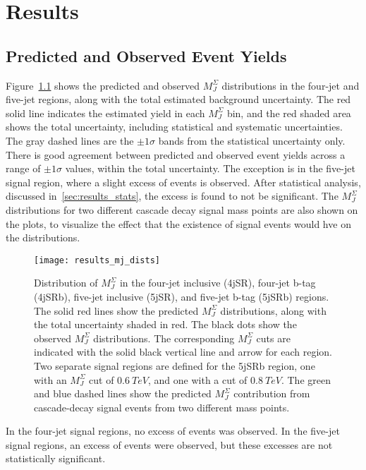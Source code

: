 \chapter{Results}\label{ch:results}

\section{Predicted and Observed Event Yields}\label{sec:results_yields}

Figure~\ref{fig:results_mj_dists} shows the predicted and observed $M_J^{\Sigma}$ distributions in the four-jet and five-jet regions, along with the total estimated background uncertainty.
The red solid line indicates the estimated yield in each $M_J^{\Sigma}$ bin, and the red shaded area shows the total uncertainty, including statistical and systematic uncertainties.
The gray dashed lines are the $\pm1\sigma$ bands from the statistical uncertainty only.
There is good agreement between predicted and observed event yields across a range of $\pm1\sigma$ values, within the total uncertainty.
The exception is in the five-jet signal region, where a slight excess of events is observed.
After statistical analysis, discussed in~\ref{sec:results_stats}, the excess is found to not be significant.
The $M_J^{\Sigma}$ distributions for two different cascade decay signal mass points are also shown on the plots, to visualize the effect that the existence of signal events would hve on the distributions.

\begin{figure}[!ht]
    \centering
\texttt{[image: results\_mj\_dists]}
\caption{Distribution of $M_J^{\Sigma}$ in the four-jet inclusive (4jSR), four-jet b-tag (4jSRb), five-jet inclusive
(5jSR), and five-jet b-tag (5jSRb) regions.
The solid red lines show the predicted $M_J^{\Sigma}$ distributions, along with the total uncertainty shaded in red.
The black dots show the observed $M_J^{\Sigma}$ distributions.
The corresponding $M_J^{\Sigma}$ cuts are indicated with the solid black vertical line and arrow for each region.
Two separate signal regions are defined for the 5jSRb region, one with an $M_J^{\Sigma}$ cut of $0.6~TeV$,
and one with a cut of $0.8~TeV$.
The green and blue dashed lines show the predicted $M_J^{\Sigma}$ contribution from cascade-decay signal events
from two different mass points.
}
\label{fig:results_mj_dists}
\end{figure}

In the four-jet signal regions, no excess of events was observed.
In the five-jet signal regions, an excess of events were observed, but these excesses are not statistically
significant.


